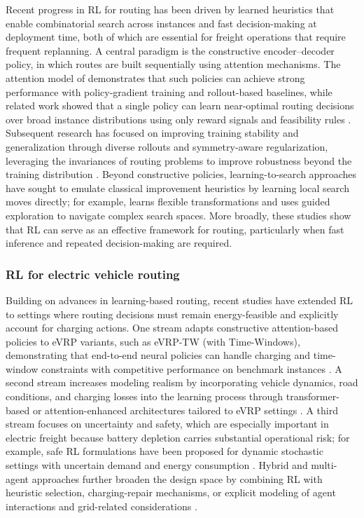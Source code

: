 \documentclass[a4paper,fleqn]{cas-sc}
\begin{document}
Recent progress in RL for routing has been driven by learned heuristics that enable combinatorial search across instances and fast decision-making at deployment time, both of which are essential for freight operations that require frequent replanning. A central paradigm is the constructive encoder--decoder policy, in which routes are built sequentially using attention mechanisms. The attention model of \cite{kool2018attention} demonstrates that such policies can achieve strong performance with policy-gradient training and rollout-based baselines, while related work showed that a single policy can learn near-optimal routing decisions over broad instance distributions using only reward signals and feasibility rules \citep{NEURIPS2018_9fb4651c}. Subsequent research has focused on improving training stability and generalization through diverse rollouts and symmetry-aware regularization, leveraging the invariances of routing problems to improve robustness beyond the training distribution \citep{Sym-NCO}. Beyond constructive policies, learning-to-search approaches have sought to emulate classical improvement heuristics by learning local search moves directly; for example, \cite{NEURIPS2023_9bae70d3} learns flexible transformations and uses guided exploration to navigate complex search spaces. More broadly, these studies show that RL can serve as an effective framework for routing, particularly when fast inference and repeated decision-making are required.


\subsubsection{RL for electric vehicle routing}

Building on advances in learning-based routing, recent studies have extended RL to settings where routing decisions must remain energy-feasible and explicitly account for charging actions. One stream adapts constructive attention-based policies to eVRP variants, such as eVRP-TW (with Time-Windows), demonstrating that end-to-end neural policies can handle charging and time-window constraints with competitive performance on benchmark instances \citep{lin2025,10608117}. A second stream increases modeling realism by incorporating vehicle dynamics, road conditions, and charging losses into the learning process through transformer-based or attention-enhanced architectures tailored to eVRP settings \citep{TANG2023121711,11016767}. A third stream focuses on uncertainty and safety, which are especially important in electric freight because battery depletion carries substantial operational risk; for example, safe RL formulations have been proposed for dynamic stochastic settings with uncertain demand and energy consumption \citep{BASSO2022102496}. Hybrid and multi-agent approaches further broaden the design space by combining RL with heuristic selection, charging-repair mechanisms, or explicit modeling of agent interactions and grid-related considerations \citep{lin2022,10310266,ALQAHTANI2022122626}. 
\end{document}
